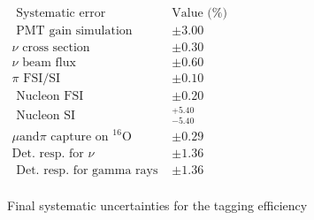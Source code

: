 \begin{table}[htb!]
\centering
    $\begin{array}{lll}
    \hline \text { Systematic error} & \text{Value (\%)} \\
    \hline 
    \text { PMT gain simulation } & \pm 3.00 \\ 
    \nu \text { cross section } & \pm 0.30 \\ 
    \nu \text { beam flux } & \pm 0.60 \\ 
    \pi \text { FSI/SI } & \pm 0.10  \\ 
    \text { Nucleon FSI } & \pm 0.20  \\ 
    \text { Nucleon SI } & { }_{-5.40}^{+5.40} \\ 
    \mu \text{and} \pi \text { capture on }{ }^{16} \mathrm{O} & \pm 0.29\\ 
    \text{Det. resp. for $\nu$} & \pm 1.36\\
    \text { Det. resp. for gamma rays }& \pm 1.36 \\ 
    \end{array}$
\caption{Final systematic uncertainties for the tagging efficiency} 
\label{table:systuncertaintytable}
\end{table}


